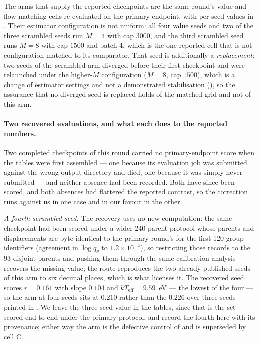 The arms that supply the reported checkpoints are the same round's value and
flow-matching cells re-evaluated on the primary endpoint, with per-seed values in
. Their estimator configuration is not uniform: all four value
seeds and two of the three scrambled seeds run $M = 4$ with cap $3000$, and the third
scrambled seed runs $M = 8$ with cap $1500$ and batch 4, which is the one reported cell
that is not configuration-matched to its comparator. That seed is additionally a
\emph{replacement}: two seeds of the scrambled arm diverged before their first
checkpoint and were relaunched under the higher-$M$ configuration ($M = 8$, cap
$1500$), which is a change of estimator settings and not a demonstrated stabilisation
(), so the assurance that no diverged seed is replaced holds of the
matched grid and not of this arm.

\paragraph{Two recovered evaluations, and what each does to the reported numbers.} Two
completed checkpoints of this round carried no primary-endpoint score when the tables
were first assembled --- one because its evaluation job was submitted against the wrong
output directory and died, one because it was simply never submitted --- and neither
absence had been recorded. Both have since been scored, and both absences had flattered
the reported contrast, so the correction runs against us in one case and in our favour
in the other.

\emph{A fourth scrambled seed.} The recovery uses no new computation: the same
checkpoint had been scored under a wider 240-parent protocol whose parents and
displacements are byte-identical to the primary round's for the first 120 group
identifiers (agreement in $\log q_\theta$ to $1.2\times10^{-4}$), so restricting those
records to the 93 disjoint parents and pushing them through the same calibration
analysis recovers the missing value; the route reproduces the two already-published
seeds of this arm to six decimal places, which is what licenses it. The recovered seed
scores $r = 0.161$ with slope $0.104$ and $kT_{\mathrm{eff}} = 9.59$~eV --- the lowest of
the four --- so the arm at four seeds sits at $0.210$ rather than the $0.226$ over three
seeds printed in . We leave the three-seed value in the
tables, since that is the set scored end-to-end under the primary protocol, and record
the fourth here with its provenance; either way the arm is the defective control of
 and is superseded by cell C.

